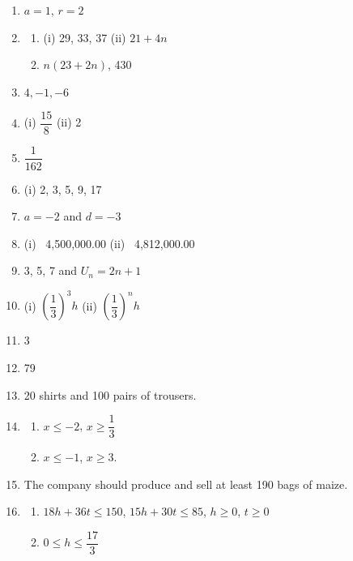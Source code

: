 \begin{enumerate}
\item $a = 1$, $r = 2$
\item
\begin{enumerate}
  \item[a.] (i) 29, 33, 37 \quad (ii) $21 + 4n$
  \item[b.] $n(23 + 2n)$, 430
\end{enumerate}
\item $4, -1, -6$
\item (i) $\dfrac{15}{8}$ \quad (ii) 2
\item $\dfrac{1}{162}$
\item (i) 2, 3, 5, 9, 17
\item $a = -2$ and $d = -3$
\item (i) \cedi\ 4,500,000.00 \quad (ii) \cedi\ 4,812,000.00
\item 3, 5, 7 and $U_n = 2n + 1$
\item (i) $\left(\dfrac{1}{3}\right)^3 h$ \quad (ii) $\left(\dfrac{1}{3}\right)^n h$
\item 3
\item 79
\item 20 shirts and 100 pairs of trousers.
\item
\begin{enumerate}
  \item[a.] $x \le -2$, $x \ge \dfrac{1}{3}$
  \item[b.] $x \le -1$, $x \ge 3$.
\end{enumerate}
\item The company should produce and sell at least 190 bags of maize.
\item
\begin{enumerate}
  \item[a.] $18h + 36t \le 150$, $15h + 30t \le 85$, $h \ge 0$, $t \ge 0$
  \item[b.] $0 \le h \le \dfrac{17}{3}$
\end{enumerate}
\end{enumerate}
